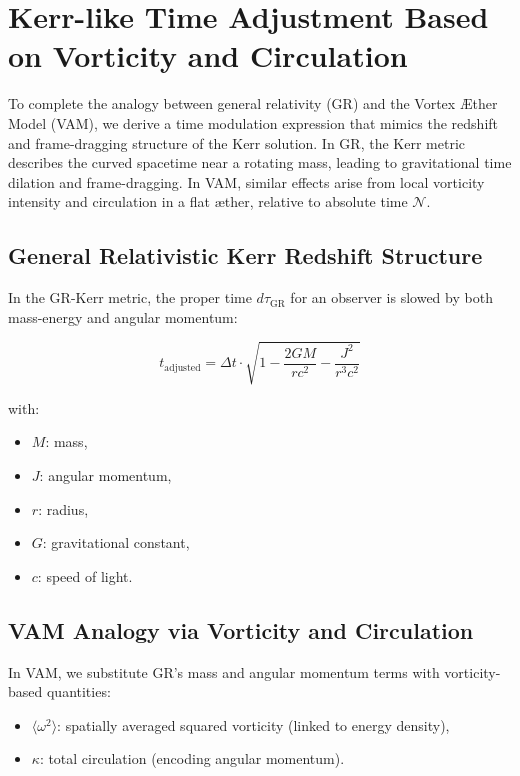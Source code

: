 \section{Kerr-like Time Adjustment Based on Vorticity and Circulation}

To complete the analogy between general relativity (GR) and the Vortex Æther Model (VAM), we derive a time modulation expression that mimics the redshift and frame-dragging structure of the Kerr solution. In GR, the Kerr metric describes the curved spacetime near a rotating mass, leading to gravitational time dilation and frame-dragging. In VAM, similar effects arise from local vorticity intensity and circulation in a flat æther, relative to absolute time \( \mathcal{N} \).

\subsection{General Relativistic Kerr Redshift Structure}

In the GR-Kerr metric, the proper time \( d\tau_{\text{GR}} \) for an observer is slowed by both mass-energy and angular momentum:

\begin{equation}
    t_{\text{adjusted}} = \Delta t \cdot \sqrt{1 - \frac{2GM}{rc^2} - \frac{J^2}{r^3c^2}}
    \label{eq:Kerr_time_dilation}
\end{equation}

\noindent with:
\begin{itemize}
    \item \( M \): mass,
    \item \( J \): angular momentum,
    \item \( r \): radius,
    \item \( G \): gravitational constant,
    \item \( c \): speed of light.
\end{itemize}

\subsection{VAM Analogy via Vorticity and Circulation}

In VAM, we substitute GR's mass and angular momentum terms with vorticity-based quantities:

\begin{itemize}
    \item \( \langle \omega^2 \rangle \): spatially averaged squared vorticity (linked to energy density),
    \item \( \kappa \): total circulation (encoding angular momentum).
\end{itemize}

